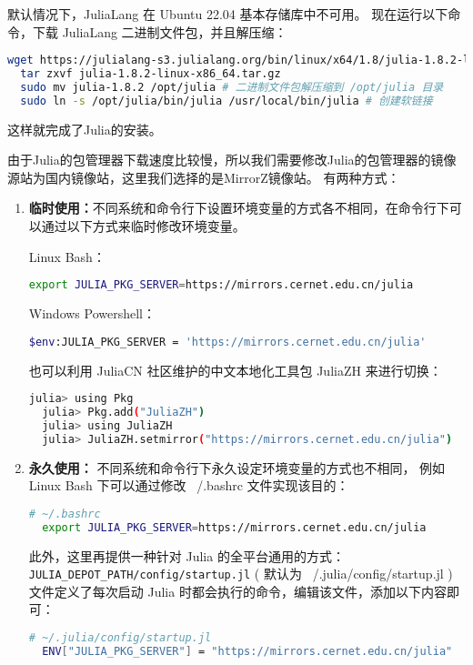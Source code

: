 \documentclass[lang=cn,a4paper,newtx]{elegantpaper}
\begin{document}
默认情况下，JuliaLang 在 Ubuntu 22.04 基本存储库中不可用。
现在运行以下命令，下载 JuliaLang 二进制文件包，并且解压缩：
\begin{lstlisting}[language=bash]
  wget https://julialang-s3.julialang.org/bin/linux/x64/1.8/julia-1.8.2-linux-x86_64.tar.gz
  tar zxvf julia-1.8.2-linux-x86_64.tar.gz
  sudo mv julia-1.8.2 /opt/julia # 二进制文件包解压缩到 /opt/julia 目录
  sudo ln -s /opt/julia/bin/julia /usr/local/bin/julia # 创建软链接
\end{lstlisting}
这样就完成了Julia的安装。

由于Julia的包管理器下载速度比较慢，所以我们需要修改Julia的包管理器的镜像源站为国内镜像站，这里我们选择的是MirrorZ镜像站。
有两种方式：
\begin{enumerate}[label=\arabic*). ]
  \item \textbf{临时使用：}不同系统和命令行下设置环境变量的方式各不相同，在命令行下可以通过以下方式来临时修改环境变量。

  Linux Bash：
\begin{lstlisting}[language=bash]
  export JULIA_PKG_SERVER=https://mirrors.cernet.edu.cn/julia
\end{lstlisting}

  Windows Powershell：
\begin{lstlisting}[language=bash]
  $env:JULIA_PKG_SERVER = 'https://mirrors.cernet.edu.cn/julia'
\end{lstlisting}

  也可以利用 JuliaCN 社区维护的中文本地化工具包 JuliaZH 来进行切换：
\begin{lstlisting}[language=bash]
  julia> using Pkg
  julia> Pkg.add("JuliaZH")
  julia> using JuliaZH
  julia> JuliaZH.setmirror("https://mirrors.cernet.edu.cn/julia")
\end{lstlisting}
  \item \textbf{永久使用：} 不同系统和命令行下永久设定环境变量的方式也不相同，
  例如 Linux Bash 下可以通过修改 ~/.bashrc 文件实现该目的：
\begin{lstlisting}[language=bash]
  # ~/.bashrc
  export JULIA_PKG_SERVER=https://mirrors.cernet.edu.cn/julia
\end{lstlisting}

  此外，这里再提供一种针对 Julia 的全平台通用的方式：\verb|JULIA_DEPOT_PATH/config/startup.jl| ( 默认为 ~/.julia/config/startup.jl ) 文件定义了每次启动 Julia 时都会执行的命令，编辑该文件，添加以下内容即可：
\begin{lstlisting}[language=bash]
  # ~/.julia/config/startup.jl
  ENV["JULIA_PKG_SERVER"] = "https://mirrors.cernet.edu.cn/julia"
\end{lstlisting}


\end{enumerate}
\end{document}
